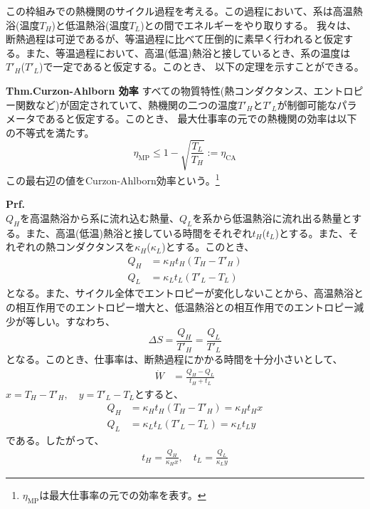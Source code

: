 \documentclass[a4paper,10.5pt]{jsarticle}
\numberwithin{equation}{section}
\begin{document}
この枠組みでの熱機関のサイクル過程を考える。この過程において、系は高温熱浴(温度$T_{H}$)と低温熱浴(温度$T_{L}$)との間でエネルギーをやり取りする。
我々は、断熱過程は可逆であるが、等温過程に比べて圧倒的に素早く行われると仮定する。また、等温過程において、高温(低温)熱浴と接しているとき、系の温度は$T'_H$($T'_L$)で一定であると仮定する。このとき、
以下の定理を示すことができる。

\begin{itembox}[l]{\textbf{Thm.Curzon-Ahlborn 効率}}
  すべての物質特性(熱コンダクタンス、エントロピー関数など)が固定されていて、熱機関の二つの温度$T'_H$と$T'_L$が制御可能なパラメータであると仮定する。このとき、
  最大仕事率の元での熱機関の効率は以下の不等式を満たす。
  \begin{equation}
    \eta_{\text{MP}} \leq 1 - \sqrt{\frac{T_L}{T_H}} := \eta_{\text{CA}}
  \end{equation}
  この最右辺の値をCurzon-Ahlborn効率という。\footnote{$\eta_{\text{MP}}$は最大仕事率の元での効率を表す。}
\end{itembox}
\textbf{Prf.}\\
$Q_{H}$を高温熱浴から系に流れ込む熱量、$Q_{L}$を系から低温熱浴に流れ出る熱量とする。また、高温(低温)熱浴と接している時間をそれぞれ$t_{H}$($t_{L}$)とする。また、それぞれの熱コンダクタンスを$\kappa_{H}$($\kappa_{L}$)とする。このとき、
\begin{align}
  Q_{H} &= \kappa_{H}t_{H}(T_{H}-T'_{H})\\
  Q_{L} &= \kappa_{L}t_{L}(T'_{L}-T_{L})
\end{align}
となる。また、サイクル全体でエントロピーが変化しないことから、高温熱浴との相互作用でのエントロピー増大と、低温熱浴との相互作用でのエントロピー減少が等しい。すなわち、
\begin{equation}
  \Delta S = \frac{Q_{H}}{T'_{H}} = \frac{Q_{L}}{T'_{L}}
\end{equation}
となる。このとき、仕事率は、断熱過程にかかる時間を十分小さいとして、
\begin{align}
  \dot{W} &= \frac{Q_{H} - Q_{L}}{t_{H} + t_{L}}
\end{align}
$x = T_{H} - T'_{H},\quad y = T'_{L} - T_{L}$とすると、
\begin{align}
  Q_{H} &= \kappa_{H}t_{H}(T_{H}-T'_{H}) = \kappa_{H}t_{H}x\\
  Q_{L} &= \kappa_{L}t_{L}(T'_{L}-T_{L}) = \kappa_{L}t_{L}y
\end{align}
である。したがって、
\begin{align}
  t_{H} = \frac{Q_{H}}{\kappa_{H}x},\quad t_{L} = \frac{Q_{L}}{\kappa_{L}y}
\end{align}
\end{document}
